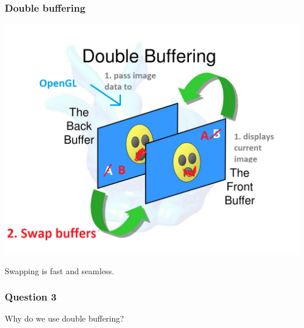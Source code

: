 \documentclass{beamer}
\begin{document}
\begin{frame}
    \frametitle{Double buffering}

    \begin{center}
        \includegraphics[scale=0.4]{q3-step2.png}
    \end{center}

    Swapping is fast and seamless.

\end{frame}

\begin{frame}
    \frametitle{Question 3}

    Why do we use double buffering?

\end{frame}
\end{document}
